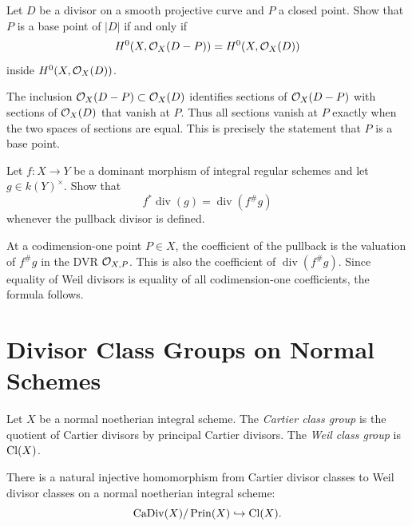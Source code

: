 \begin{exercise}\label{ex:basepoint-subtraction}
Let \(D\) be a divisor on a smooth projective curve and \(P\) a closed point.
Show that \(P\) is a base point of \(|D|\) if and only if
\[
    H^0(X,\mathcal{O}_X(D-P))=H^0(X,\mathcal{O}_X(D))
\]
inside \(H^0(X,\mathcal{O}_X(D))\).
\end{exercise}

\begin{solution}
The inclusion \(\mathcal{O}_X(D-P)\subset\mathcal{O}_X(D)\) identifies sections of
\(\mathcal{O}_X(D-P)\) with sections of \(\mathcal{O}_X(D)\) that vanish at \(P\).  Thus all
sections vanish at \(P\) exactly when the two spaces of sections are equal.
This is precisely the statement that \(P\) is a base point.
\end{solution}

\begin{exercise}\label{ex:pullback-principal}
Let \(f:X\to Y\) be a dominant morphism of integral regular schemes and let
\(g\in k(Y)^\times\).  Show that
\[
    f^*\operatorname{div}(g)=\operatorname{div}(f^\#g)
\]
whenever the pullback divisor is defined.
\end{exercise}

\begin{solution}
At a codimension-one point \(P\in X\), the coefficient of the pullback is the
valuation of \(f^\#g\) in the DVR \(\mathcal{O}_{X,P}\).  This is also the coefficient
of \(\operatorname{div}(f^\#g)\).  Since equality of Weil divisors is equality
of all codimension-one coefficients, the formula follows.
\end{solution}

\section{Divisor Class Groups on Normal Schemes}

\begin{definition}
Let \(X\) be a normal noetherian integral scheme.  The \emph{Cartier class
group} is the quotient of Cartier divisors by principal Cartier divisors.  The
\emph{Weil class group} is \(\operatorname{Cl}(X)\).
\end{definition}

\begin{proposition}
There is a natural injective homomorphism from Cartier divisor classes to Weil
divisor classes on a normal noetherian integral scheme:
\[
    \operatorname{CaDiv}(X)/\operatorname{Prin}(X)\hookrightarrow \operatorname{Cl}(X).
\]
\end{proposition}


